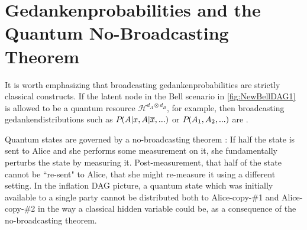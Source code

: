 \section{Gedankenprobabilities and the Quantum No-Broadcasting Theorem}\label{sec:classicallity}

It is worth emphasizing that broadcasting gedankenprobabilities %
are strictly classical constructs. If the latent node in the Bell scenario in \cref{fig:NewBellDAG1} is allowed to be a quantum resource $\mathcal{H}^{d_A\otimes d_B}$, for example, then broadcasting gedankendistributions such as ${P_{}}\lparen A|x , A|\overline{x},...\rparen$ or ${P_{}}\lparen A_1,A_2,...\rparen$ are . 

Quantum states are governed by a no-broadcasting theorem \cite{NoCloningQuantum1996,NoCloningGeneral2006}: If half the state is sent to Alice and she performs some measurement on it, she fundamentally perturbs the state by measuring it. Post-measurement, that half of the state cannot be ``re-sent" to Alice, that she might re-measure it using a different setting. In the inflation DAG picture, a quantum state which was initially available to a single party cannot be distributed both to Alice-copy-\#1 and Alice-copy-\#2 in the way a classical hidden variable could be, as a consequence of the no-broadcasting theorem. 


